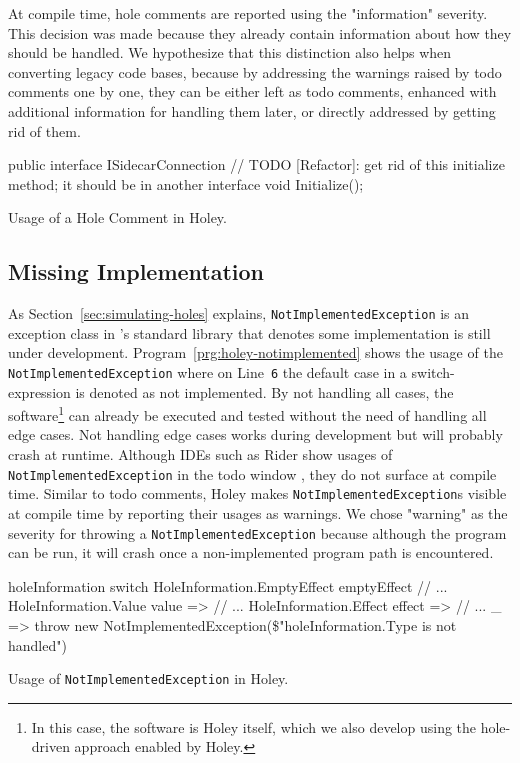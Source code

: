 At compile time, hole comments are reported using the "information" severity.
This decision was made because they already contain information about how they should be handled.
We hypothesize that this distinction also helps when converting legacy code bases, because by addressing the warnings raised by todo comments one by one, they can be either left as todo comments, enhanced with additional information for handling them later, or directly addressed by getting rid of them.

\begin{program}[ht]
\begin{CsCode}
public interface ISidecarConnection
{
	// TODO [Refactor]: get rid of this initialize method; it should be in another interface
	void Initialize();
}
\end{CsCode}
\caption{Usage of a Hole Comment in Holey.}
\label{prg:holey-hole-comment}
\end{program}

\subsection{Missing Implementation}
As Section~\ref{sec:simulating-holes} explains, \texttt{NotImplementedException} is an exception class in \CS's standard library that denotes some implementation is still under development.
Program~\ref{prg:holey-notimplemented} shows the usage of the \texttt{NotImplementedException} where on Line~\verb|6| the default case in a switch-expression is denoted as not implemented.
By not handling all cases, the software\footnote{In this case, the software is Holey itself, which we also develop using the hole-driven approach enabled by Holey.} can already be executed and tested without the need of handling all edge cases.
Not handling edge cases works during development but will probably crash at runtime.
Although IDEs such as Rider show usages of \texttt{NotImplementedException} in the todo window \cite{jetbrains_todo_2023}, they do not surface at compile time.
Similar to todo comments, Holey makes \texttt{NotImplementedException}s visible at compile time by reporting their usages as warnings.
We chose "warning" as the severity for throwing a \texttt{NotImplementedException} because although the program can be run, it will crash once a non-implemented program path is encountered.

\begin{program}[ht]
\begin{CsCode}
holeInformation switch
{
	HoleInformation.EmptyEffect emptyEffect // ...
	HoleInformation.Value value => // ...
	HoleInformation.Effect effect => // ...
	_ => throw new NotImplementedException(\$"{holeInformation.Type} is not handled")
}
\end{CsCode}
\caption{Usage of \texttt{NotImplementedException} in Holey.}
\label{prg:holey-notimplemented}
\end{program}

